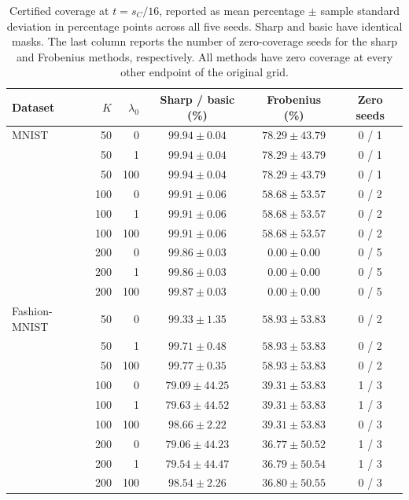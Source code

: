 \begin{table}[!htbp]
\centering\small
\caption{Certified coverage at $t=s_C/16$, reported as mean percentage $\pm$ sample standard deviation in percentage points across all five seeds. Sharp and basic have identical masks. The last column reports the number of zero-coverage seeds for the sharp and Frobenius methods, respectively. All methods have zero coverage at every other endpoint of the original grid.}
\label{tab:coverage}
\begin{tabular}{@{}lrrccc@{}}
\toprule
Dataset & $K$ & $\lambda_0$ & Sharp / basic (\%) & Frobenius (\%) & Zero seeds \\
\midrule
MNIST & 50 & 0 & $99.94\pm0.04$ & $78.29\pm43.79$ & 0 / 1 \\
 & 50 & 1 & $99.94\pm0.04$ & $78.29\pm43.79$ & 0 / 1 \\
 & 50 & 100 & $99.94\pm0.04$ & $78.29\pm43.79$ & 0 / 1 \\
 & 100 & 0 & $99.91\pm0.06$ & $58.68\pm53.57$ & 0 / 2 \\
 & 100 & 1 & $99.91\pm0.06$ & $58.68\pm53.57$ & 0 / 2 \\
 & 100 & 100 & $99.91\pm0.06$ & $58.68\pm53.57$ & 0 / 2 \\
 & 200 & 0 & $99.86\pm0.03$ & $0.00\pm0.00$ & 0 / 5 \\
 & 200 & 1 & $99.86\pm0.03$ & $0.00\pm0.00$ & 0 / 5 \\
 & 200 & 100 & $99.87\pm0.03$ & $0.00\pm0.00$ & 0 / 5 \\
\addlinespace
Fashion-MNIST & 50 & 0 & $99.33\pm1.35$ & $58.93\pm53.83$ & 0 / 2 \\
 & 50 & 1 & $99.71\pm0.48$ & $58.93\pm53.83$ & 0 / 2 \\
 & 50 & 100 & $99.77\pm0.35$ & $58.93\pm53.83$ & 0 / 2 \\
 & 100 & 0 & $79.09\pm44.25$ & $39.31\pm53.83$ & 1 / 3 \\
 & 100 & 1 & $79.63\pm44.52$ & $39.31\pm53.83$ & 1 / 3 \\
 & 100 & 100 & $98.66\pm2.22$ & $39.31\pm53.83$ & 0 / 3 \\
 & 200 & 0 & $79.06\pm44.23$ & $36.77\pm50.52$ & 1 / 3 \\
 & 200 & 1 & $79.54\pm44.47$ & $36.79\pm50.54$ & 1 / 3 \\
 & 200 & 100 & $98.54\pm2.26$ & $36.80\pm50.55$ & 0 / 3 \\
\bottomrule
\end{tabular}
\end{table}

